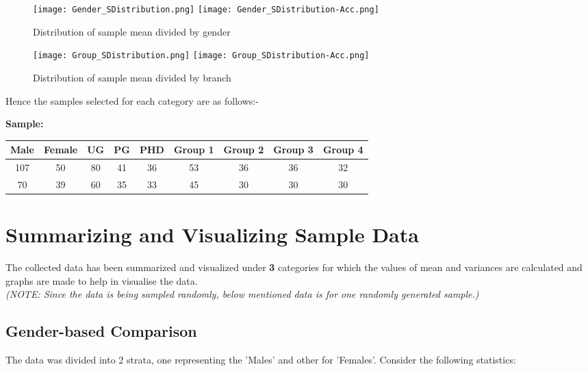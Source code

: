 \documentclass[12pt,a4paper]{report}
\begin{document}
\begin{figure}[h]
    \centering
    \texttt{[image: Gender\_SDistribution.png]}
    \texttt{[image: Gender\_SDistribution-Acc.png]}
    \caption{Distribution of sample mean divided by gender }
\end{figure}

\begin{figure}[h]
    \centering
    \texttt{[image: Group\_SDistribution.png]}
    \texttt{[image: Group\_SDistribution-Acc.png]}
    \caption{Distribution of sample mean divided by branch }
\end{figure}

\newpage
Hence the samples selected for each category are as follows:-

\begin{center}
  \textbf{Sample:}\\
  \vspace{0.5cm}
\begin{tabular}{ |c|c|c|c|c|c|c|c|c|}
  \hline
  Male & Female & UG & PG & PHD & Group 1 & Group 2 & Group 3 & Group 4 \\
  \hline
  107 & 50 & 80 & 41 & 36 & 53 & 36 & 36 & 32 \\ 
  \hline
  70 & 39 & 60 & 35 & 33 & 45 & 30 & 30 & 30 \\ 
  \hline
\end{tabular}
\end{center}
\vspace{2mm}
\newpage

\section*{\Huge{Summarizing and Visualizing Sample Data}}
The collected data has been summarized and visualized under \textbf{3} categories for which the values of mean and variances are calculated and graphs are made to help in visualise the data.\\
\emph{(NOTE: Since the data is being sampled randomly, below mentioned data is for one randomly generated sample.)}

\subsection*{Gender-based Comparison}
The data was divided into 2 strata, one representing the 'Males' and other for 'Females'. Consider the following statistics:
\end{document}

